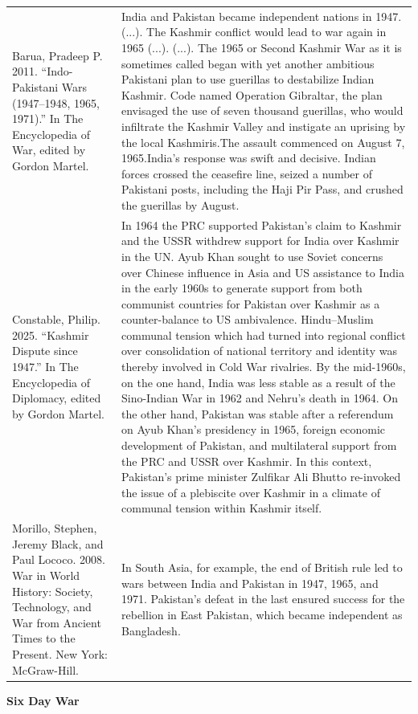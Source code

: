 {\begin{longtable}{p{}p{}}
\\
Barua, Pradeep P. 2011. “Indo-Pakistani Wars (1947–1948, 1965, 1971).” In The Encyclopedia of War, edited by Gordon Martel. & India and Pakistan became independent nations in 1947. (...). The Kashmir conflict would lead to war again in 1965 (...). (...). 
The 1965 or Second Kashmir War as it is sometimes called began with yet another ambitious Pakistani plan to use guerillas to destabilize Indian Kashmir. Code named Operation Gibraltar, the plan envisaged the use of seven thousand guerillas, who would infiltrate the Kashmir Valley and instigate an uprising by the local Kashmiris.The assault commenced on August 7, 1965.India's response was swift and decisive. Indian forces crossed the ceasefire line, seized a number of Pakistani posts, including the Haji Pir Pass, and crushed the guerillas by August.
\\
Constable, Philip. 2025. “Kashmir Dispute since 1947.” In The Encyclopedia of Diplomacy, edited by Gordon Martel. & In 1964 the PRC supported Pakistan's claim to Kashmir and the USSR withdrew support for India over Kashmir in the UN. Ayub Khan sought to use Soviet concerns over Chinese influence in Asia and US assistance to India in the early 1960s to generate support from both communist countries for Pakistan over Kashmir as a counter-balance to US ambivalence. Hindu–Muslim communal tension which had turned into regional conflict over consolidation of national territory and identity was thereby involved in Cold War rivalries. By the mid-1960s, on the one hand, India was less stable as a result of the Sino-Indian War in 1962 and Nehru's death in 1964. On the other hand, Pakistan was stable after a referendum on Ayub Khan's presidency in 1965, foreign economic development of Pakistan, and multilateral support from the PRC and USSR over Kashmir. In this context, Pakistan's prime minister Zulfikar Ali Bhutto re-invoked the issue of a plebiscite over Kashmir in a climate of communal tension within Kashmir itself.
\\
Morillo, Stephen, Jeremy Black, and Paul Lococo. 2008. War in World History: Society, Technology, and War from Ancient Times to the Present. New York: McGraw-Hill. & In South Asia, for example, the end of British rule led to wars between India and Pakistan in 1947, 1965, and 1971. Pakistan's defeat in the last ensured success for the rebellion in East Pakistan, which became independent as Bangladesh.
\\
\end{longtable}}
\clearpage
         \textbf{Six Day War} 

